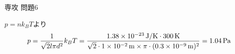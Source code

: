 \documentclass[fleqn]{jbook}
\begin{document}
\begin{answer}{専攻 問題6}{}
\begin{subanswers}
\begin{subsubanswers}
  \SubSubAnswer
    $p=nk_B T$より
%
    \[ p  = \frac{1}{\sqrt{2}l\pi d^2} k_B T %
          = \frac{1.38\Keta{-23} \Unit{J/K} \cdot 300 \Unit{K}}{\sqrt{2}\cdot 1\Keta{-2}\Unit{m}\times \pi \cdot (0.3\Keta{-9}\Unit{m})^2}%
          = 1.04 \Unit{Pa} \]
%
  \end{subsubanswers}
\end{subanswers}
\end{answer}
\end{document}

